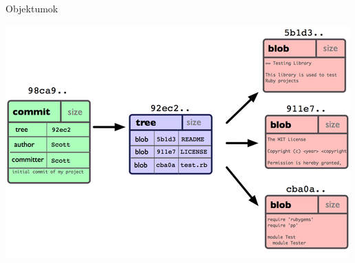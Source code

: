 
\begin{frame}{Objektumok}
    \begin{center}
        \includegraphics{frames/diagrams/blobs.png}
    \end{center}
\end{frame}

